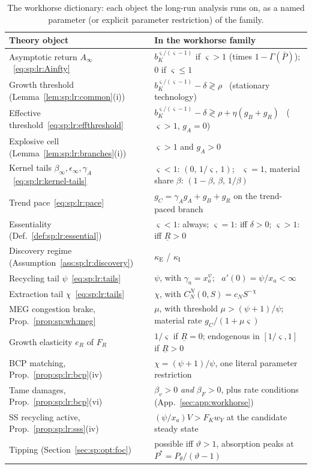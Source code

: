 \begin{table}[ht]
\centering
{\renewcommand{\arraystretch}{1.35}
\begin{tabular}{l|l}
Theory object & In the workhorse family \\
\hline
Asymptotic return $A_\infty$~\eqref{eq:sp:lr:Ainfty} & $b_K^{\varsigma/\left(\varsigma-1\right)}$ if $\varsigma>1$ (times $1-\Gamma\left(\bar P\right)$); $0$ if $\varsigma\le1$ \\
Growth threshold (Lemma~\ref{lem:sp:lr:common}(i)) & $b_K^{\varsigma/\left(\varsigma-1\right)}-\delta\gtrless\rho$ \ (stationary technology) \\
Effective threshold~\eqref{eq:sp:lr:effthreshold} & $b_K^{\varsigma/\left(\varsigma-1\right)}-\delta\gtrless\rho+\eta\left(g_B+g_R\right)$ \ ($\varsigma>1$, $g_A=0$) \\
Explosive cell (Lemma~\ref{lem:sp:lr:branches}(i)) & $\varsigma>1$ and $g_A>0$ \\
Kernel tails $\beta_\infty,\epsilon_\infty,\gamma_A$~\eqref{eq:sp:lr:kernel-tails} & $\varsigma<1$: $\left(0,\,1/\varsigma,\,1\right)$; \ $\varsigma=1$, material share $\beta$: $\left(1-\beta,\,\beta,\,1/\beta\right)$ \\
Trend pace~\eqref{eq:sp:lr:pace} & $g_C=\gamma_Ag_A+g_B+g_R$ on the trend-paced branch \\
Essentiality (Def.~\ref{def:sp:lr:essential}) & $\varsigma<1$: always; $\varsigma=1$: iff $\delta>0$; $\varsigma>1$: iff $\underline R>0$ \\
Discovery regime (Assumption~\ref{ass:sp:lr:discovery}) & $\kappa_{\mathrm E}$ / $\kappa_{\mathrm I}$ \\
Recycling tail $\psi$~\eqref{eq:sp:lr:tails} & $\psi$, with $\gamma_a=x_a^{\psi}$; \ $a'\!\left(0\right)=\psi/x_a<\infty$ \\
Extraction tail $\chi$~\eqref{eq:sp:lr:tails} & $\chi$, with $C^N_N\left(0,S\right)=c_NS^{-\chi}$ \\
MEG congestion brake, Prop.~\ref{prop:sp:wh:meg} & $\mu$, with threshold $\mu>\left(\psi+1\right)/\psi$; material rate $g_C/\left(1+\mu\varsigma\right)$ \\
Growth elasticity $e_R$ of $F_R$ & $1/\varsigma$ if $\underline R=0$; endogenous in $\left[1/\varsigma,1\right]$ if $\underline R>0$ \\
BCP matching, Prop.~\ref{prop:sp:lr:bcp}(iv) & $\chi=\left(\psi+1\right)/\psi$, one literal parameter restriction \\
Tame damages, Prop.~\ref{prop:sp:lr:bcp}(vi) & $\beta_v>0$ \emph{and} $\beta_F>0$, plus rate conditions (App.~\ref{sec:app:workhorse}) \\
SS recycling active, Prop.~\ref{prop:sp:lr:sss}(iv) & $\left(\psi/x_a\right)V>F_Kw_Y$ at the candidate steady state \\
Tipping (Section~\ref{sec:sp:opt:foc}) & possible iff $\vartheta>1$, absorption peaks at $P^{*}=P_\theta/\left(\vartheta-1\right)$ \\
\end{tabular}}
\caption{The workhorse dictionary: each object the long-run analysis runs on, as a named
parameter (or explicit parameter restriction) of the family.}
\label{tab:sp:wh:dictionary}
\end{table}

